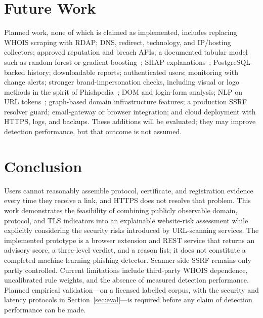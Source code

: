 \documentclass[conference]{IEEEtran}
\begin{document}
\section{Future Work}
\label{sec:future}
Planned work, none of which is claimed as implemented, includes replacing WHOIS scraping with RDAP; DNS, redirect, technology, and IP/hosting collectors; approved reputation and breach APIs; a documented tabular model such as random forest or gradient boosting~\cite{hannousse2021benchmark,rao2019detection}; SHAP explanations~\cite{lundberg2017shap}; PostgreSQL-backed history; downloadable reports; authenticated users; monitoring with change alerts; stronger brand-impersonation checks, including visual or logo methods in the spirit of Phishpedia~\cite{lin2021phishpedia}; DOM and login-form analysis; NLP on URL tokens~\cite{sahingoz2019ml}; graph-based domain infrastructure features; a production SSRF resolver guard; email-gateway or browser integration; and cloud deployment with HTTPS, logs, and backups. These additions will be evaluated; they may improve detection performance, but that outcome is not assumed.

\section{Conclusion}
\label{sec:concl}
Users cannot reasonably assemble protocol, certificate, and registration evidence every time they receive a link, and HTTPS does not resolve that problem. This work demonstrates the feasibility of combining publicly observable domain, protocol, and TLS indicators into an explainable website-risk assessment while explicitly considering the security risks introduced by URL-scanning services. The implemented prototype is a browser extension and REST service that returns an advisory score, a three-level verdict, and a reason list; it does not constitute a completed machine-learning phishing detector. Scanner-side SSRF remains only partly controlled. Current limitations include third-party WHOIS dependence, uncalibrated rule weights, and the absence of measured detection performance. Planned empirical validation---on a licensed labelled corpus, with the security and latency protocols in Section~\ref{sec:eval}---is required before any claim of detection performance can be made.




\end{document}
